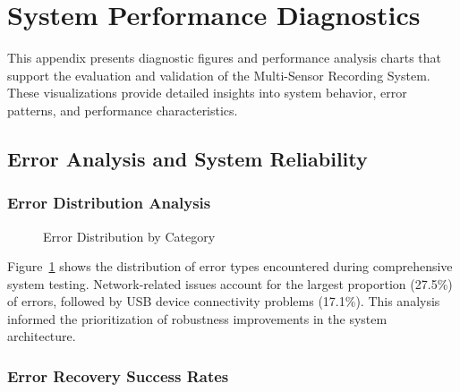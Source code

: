 \section{System Performance Diagnostics}

This appendix presents diagnostic figures and performance analysis charts that support the evaluation and validation of the Multi-Sensor Recording System. These visualizations provide detailed insights into system behavior, error patterns, and performance characteristics.

\subsection{Error Analysis and System Reliability}

\subsubsection{Error Distribution Analysis}

\begin{figure}[htbp]
\centering
{}
\caption{Error Distribution by Category}
\label{fig:error_distribution}
\end{figure}

Figure~\ref{fig:error_distribution} shows the distribution of error types encountered during comprehensive system testing. Network-related issues account for the largest proportion (27.5\%) of errors, followed by USB device connectivity problems (17.1\%). This analysis informed the prioritization of robustness improvements in the system architecture.

\subsubsection{Error Recovery Success Rates}

